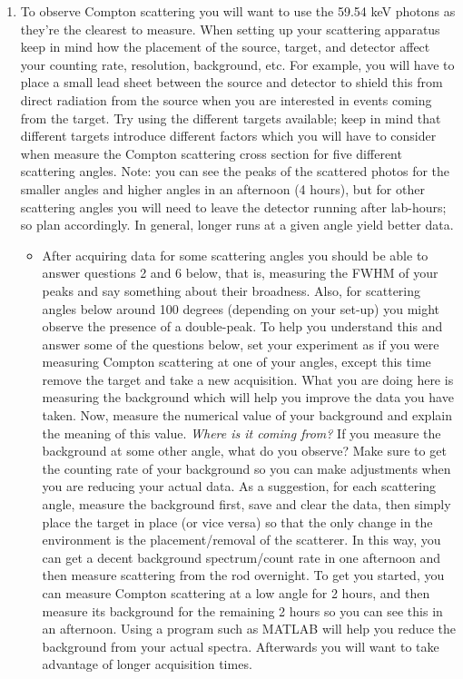\documentclass{../lab}
\begin{document}
\begin{enumerate}
    \item To observe Compton scattering you will want to use the 59.54 keV photons as they're the clearest to measure. When setting up your scattering apparatus keep in mind how the placement of the source, target, and detector affect your counting rate, resolution, background, etc. For example, you will have to place a small lead sheet between the source and detector to shield this from direct radiation from the source when you are interested in events coming from the target. Try using the different targets available; keep in mind that different targets introduce different factors which you will have to consider when measure the Compton scattering cross section for five different scattering angles. Note: you can see the peaks of the scattered photos for the smaller angles and higher angles in an afternoon (4 hours), but for other scattering angles you will need to leave the detector running after lab-hours; so plan accordingly. In general, longer runs at a given angle yield better data.

    \begin{itemize}
        \item After acquiring data for some scattering angles you should be able to answer questions 2 and 6 below, that is, measuring the FWHM of your peaks and say something about their broadness. Also, for scattering angles below around 100 degrees (depending on your set-up) you might observe the presence of a double-peak. To help you understand this and answer some of the questions below, set your experiment as if you were measuring Compton scattering at one of your angles, except this time remove the target and take a new acquisition. What you are doing here is measuring the background which will help you improve the data you have taken. Now, measure the numerical value of your background and explain the meaning of this value. \emph{Where is it coming from?} If you measure the background at some other angle, what do you observe? Make sure to get the counting rate of your background so you can make adjustments when you are reducing your actual data. As a suggestion, for each scattering angle, measure the background first, save and clear the data, then simply place the target in place (or vice versa) so that the only change in the environment is the placement/removal of the scatterer. In this way, you can get a decent background spectrum/count rate in one afternoon and then measure scattering from the rod overnight. To get you started, you can measure Compton scattering at a low angle for 2 hours, and then measure its background for the remaining 2 hours so you can see this in an afternoon. Using a program such as MATLAB will help you reduce the background from your actual spectra. Afterwards you will want to take advantage of longer acquisition times.


\end{itemize}
\end{enumerate}
\end{document}
